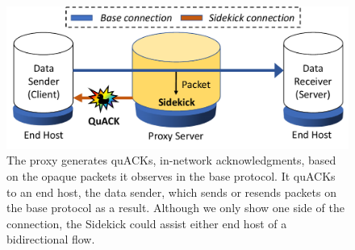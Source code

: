 \begin{figure}[t]
	\centering
	\includegraphics[width=\linewidth]{sidekick-paper/figures/sc_protocol.pdf}
\caption{The proxy generates quACKs, in-network acknowledgments, based on
the opaque packets it observes in the base protocol. It quACKs to an end
host, the data sender, which sends or resends packets on the base protocol as a result.
Although we only show one side of the connection, the Sidekick could assist
either end host of a bidirectional flow.
}
\label{fig:sc-protocols}
\end{figure}
